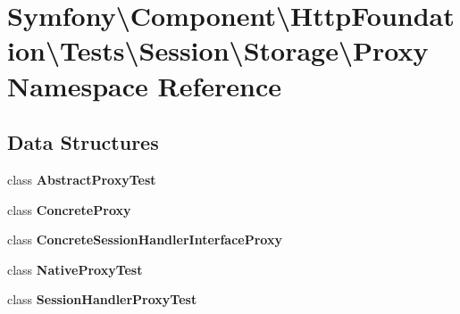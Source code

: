 \section{Symfony\textbackslash{}Component\textbackslash{}Http\+Foundation\textbackslash{}Tests\textbackslash{}Session\textbackslash{}Storage\textbackslash{}Proxy Namespace Reference}
\label{namespace_symfony_1_1_component_1_1_http_foundation_1_1_tests_1_1_session_1_1_storage_1_1_proxy}
\subsection*{Data Structures}
\begin{DoxyCompactItemize}
\item 
class {\bf Abstract\+Proxy\+Test}
\item 
class {\bf Concrete\+Proxy}
\item 
class {\bf Concrete\+Session\+Handler\+Interface\+Proxy}
\item 
class {\bf Native\+Proxy\+Test}
\item 
class {\bf Session\+Handler\+Proxy\+Test}
\end{DoxyCompactItemize}
